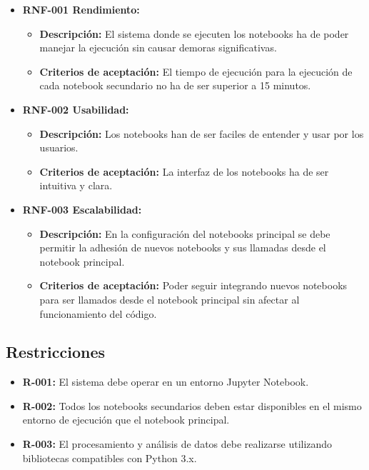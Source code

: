 \begin{itemize}
\tightlist
\item
  \textbf{RNF-001 Rendimiento:}
 
  \begin{itemize}
  \tightlist
  \item
   \textbf{Descripción:} El sistema donde se ejecuten los notebooks ha de poder manejar la ejecución sin causar demoras significativas.
  \item
   \textbf{Criterios de aceptación:} El tiempo de ejecución para la ejecución de cada notebook secundario no ha de ser superior a 15 minutos.
  \end{itemize}


\item
  \textbf{RNF-002 Usabilidad:}
  
  \begin{itemize}
  \tightlist
  \item
    \textbf{Descripción:} Los notebooks han de ser faciles de entender y usar por los usuarios.
  \item
   \textbf{Criterios de aceptación:} La interfaz de los notebooks ha de ser intuitiva y clara.
  \end{itemize}
 
  
\item
  \textbf{RNF-003 Escalabilidad:}

  \begin{itemize}
  \tightlist
  \item
    \textbf{Descripción:} En la configuración del notebooks principal se debe permitir la adhesión de nuevos notebooks y sus llamadas desde el notebook principal.
  \item
    \textbf{Criterios de aceptación:} Poder seguir integrando nuevos notebooks para ser llamados desde el notebook principal sin afectar al funcionamiento del código. 
  \end{itemize}

\end{itemize}


\subsection{Restricciones}

\begin{itemize}
\tightlist
\item
  \textbf{R-001:} El sistema debe operar en un entorno Jupyter Notebook.
 
\item
  \textbf{R-002:} Todos los notebooks secundarios deben estar disponibles en el mismo entorno de ejecución que el notebook principal.

\item
  \textbf{R-003:} El procesamiento y análisis de datos debe realizarse utilizando bibliotecas compatibles con Python 3.x.

\end{itemize}





